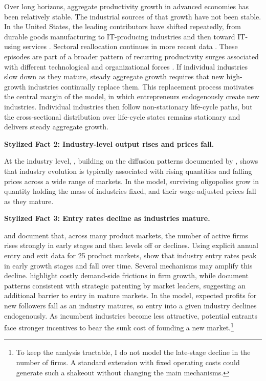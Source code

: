 \documentclass[12pt]{article}
\begin{document}
Over long horizons, aggregate productivity growth in advanced economies has been relatively stable. The industrial sources of that growth have not been stable. In the United States, the leading contributors have shifted repeatedly, from durable goods manufacturing to IT-producing industries and then toward IT-using services \citep{OlinerSS07, JorgensonHS08}. Sectoral reallocation continues in more recent data \citep{SarteT25}. These episodes are part of a broader pattern of recurring productivity surges associated with different technological and organizational forces \citep{FergusonW04}. If individual industries slow down as they mature, steady aggregate growth requires that new high-growth industries continually replace them. This replacement process motivates the central margin of the model, in which entrepreneurs endogenously create new industries. Individual industries then follow non-stationary life-cycle paths, but the cross-sectional distribution over life-cycle states remains stationary and delivers steady aggregate growth.

\medskip
\noindent\textbf{Stylized Fact 2: Industry-level output rises and prices fall.}

At the industry level, \citet{Agarwal98}, building on the diffusion patterns documented by \citet{GortK82}, shows that industry evolution is typically associated with rising quantities and falling prices across a wide range of markets. In the model, surviving oligopolies grow in quantity holding the mass of industries fixed, and their wage-adjusted prices fall as they mature.

\medskip
\noindent\textbf{Stylized Fact 3: Entry rates decline as industries mature.}

\citet{GortK82} and \citet{Agarwal98} document that, across many product markets, the number of active firms rises strongly in early stages and then levels off or declines. Using explicit annual entry and exit data for 25 product markets, \citet{AgarwalG96} show that industry entry rates peak in early growth stages and fall over time. Several mechanisms may amplify this decline. \citet{ArgenteFMP25} highlight costly demand-side frictions in firm growth, while \citet{ArgenteBHM25} document patterns consistent with strategic patenting by market leaders, suggesting an additional barrier to entry in mature markets. In the model, expected profits for new followers fall as an industry matures, so entry into a given industry declines endogenously. As incumbent industries become less attractive, potential entrants face stronger incentives to bear the sunk cost of founding a new market.\footnote{To keep the analysis tractable, I do not model the late-stage decline in the number of firms. A standard extension with fixed operating costs could generate such a shakeout without changing the main mechanisms.}
\end{document}
